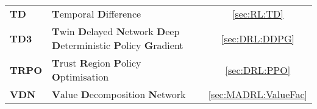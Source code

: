 \documentclass[
11pt, %
english, %
singlespacing, %
parskip, %
headsepline, %
]{MastersDoctoralThesis} %
\begin{document}
\begin{abbreviations}{}
\begin{tabularx}{\textwidth}{lXc}
\textbf{TD} & \textbf{T}emporal \textbf{D}ifference & \ref{sec:RL:TD} \\
\textbf{TD3} & \textbf{T}win \textbf{D}elayed \textbf{N}etwork \textbf{D}eep \textbf{D}eterministic \textbf{P}olicy \textbf{G}radient & \ref{sec:DRL:DDPG} \\
\textbf{TRPO} & \textbf{T}rust \textbf{R}egion \textbf{P}olicy \textbf{O}ptimisation & \ref{sec:DRL:PPO} \\
\textbf{VDN} & \textbf{V}alue \textbf{D}ecomposition \textbf{N}etwork & \ref{sec:MADRL:ValueFac} \\
\end{tabularx}



\end{abbreviations}










\end{document}
